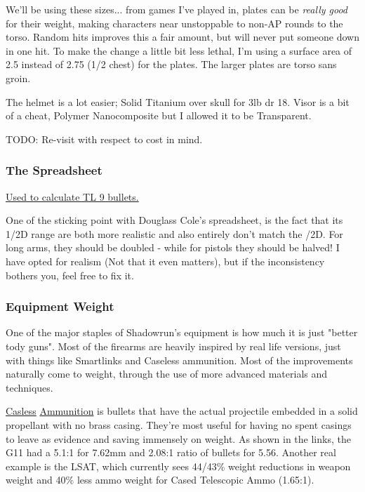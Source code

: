 \begin{multicols*}{2}
	We'll be using these sizes... from games I've played in, plates can be \textit{really good} for their weight, making characters near unstoppable to non-AP rounds to the torso. Random hits improves this a fair amount, but will never put someone down in one hit. To make the change a little bit less lethal, I'm using a surface area of 2.5 instead of 2.75 (1/2 chest) for the plates. The larger plates are torso sans groin.
	
	The helmet is a lot easier; Solid Titanium over skull for 3lb dr 18. Visor is a bit of a cheat, Polymer Nanocomposite but I allowed it to be Transparent.
	
	TODO: Re-visit with respect to cost in mind.
	
	\subsubsection{The Spreadsheet}
	
	\textcolor{Blue}{\href{http://forums.sjgames.com/showpost.php?p=2124462&postcount=37}{Used to calculate TL 9 bullets.}}
	
	One of the sticking point with Douglass Cole's spreadsheet, is the fact that its 1/2D range are both more realistic and also entirely don't match the /2D. For long arms, they should be doubled - while for pistols they should be halved! I have opted for realism (Not that it even matters), but if the inconsistency bothers you, feel free to fix it.
	
	\subsubsection{Equipment Weight}
	
	One of the major staples of Shadowrun's equipment is how much it is just "better tody guns". Most of the firearms are heavily inspired by real life versions, just with things like Smartlinks and Caseless ammunition. Most of the improvements naturally come to weight, through the use of more advanced materials and techniques.
	
	\textcolor{NavyBlue}{\href{http://futurewarstories.blogspot.com/2012/10/fws-armory-caseless-ammunition.html}{Casless}} \textcolor{Blue}{\href{http://www.projectrho.com/public_html/rocket/sidearmslug.php}{Ammunition}} is bullets that have the actual projectile embedded in a solid propellant with no brass casing. They're most useful for having no spent casings to leave as evidence and saving immensely on weight. As shown in the links, the G11 had a 5.1:1 for 7.62mm and 2.08:1 ratio of bullets for 5.56. Another real example is the LSAT, which currently sees 44/43\% weight reductions in weapon weight and 40\% less ammo weight for Cased Telescopic Ammo (1.65:1).
	

\end{multicols*}
